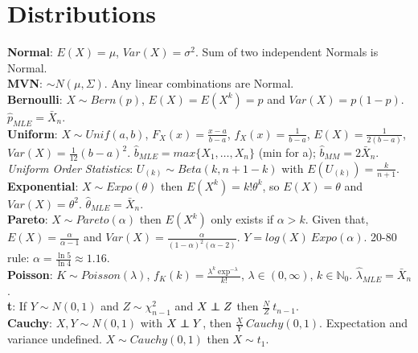 \section*{Distributions}
\textbf{Normal}: $E(X)= \mu$, $Var(X) = \sigma^2$. Sum of two independent Normals is Normal. \\
\textbf{MVN}: $\sim N(\mu, \Sigma)$. Any linear combinations are Normal. \\
\textbf{Bernoulli}: $X\sim Bern(p)$, $E(X) = E(X^k) = p$ and $Var(X) = p(1-p)$. $\hat{p}_{MLE} = \bar{X}_n$.\\
\textbf{Uniform}: $X\sim Unif(a,b)$, $F_X(x) = \frac{x-a}{b-a}$, $f_X(x) = \frac{1}{b-a}$, $E(X) = \frac{1}{2(b-a)}$, $Var(X) = \frac{1}{12}(b-a)^2$. $\hat{b}_{MLE} = max\{X_1, \ldots, X_n\}$ (min for a); $\hat{b}_{MM} = 2\bar{X}_n$.\\
\textit{Uniform Order Statistics}: $U_{(k)} \sim Beta(k, n+1-k)$ with $E(U_{(k)}) = \frac{k}{n+1}$.
\textbf{Exponential}: $X\sim Expo(\theta)$ then $E(X^k) = k!\theta^k$, so $E(X) = \theta$ and $Var(X) = \theta^2$. $\hat{\theta}_{MLE} = \bar{X}_n$.\\
\textbf{Pareto}: $X\sim Pareto(\alpha)$ then $E(X^k)$ only exists if $\alpha>k$. Given that, $E(X) = \frac{\alpha}{\alpha-1}$ and $Var(X) = \frac{\alpha}{(1-\alpha)^2(\alpha-2)}$. $Y = log(X) ~ Expo(\alpha)$. 20-80 rule: $\alpha = \frac{\ln 5}{\ln 4}\approx 1.16$.\\
\textbf{Poisson}: $K\sim Poisson(\lambda)$, $f_K(k) = \frac{\lambda^k\exp^{-\lambda}}{k!}$, $\lambda \in (0, \infty)$, $k\in\mathbb{N}_0$. $\hat{\lambda}_{MLE} = \bar{X}_n$.\\
\textbf{t}: If $Y\sim N(0,1)$ and $Z\sim \chi^2_{n-1}$ and $X\independent Z$ then $\frac{N}{Z}~t_{n-1}$.\\
\textbf{Cauchy}: $X, Y \sim N(0, 1)$ with $X\independent Y$, then $\frac{X}{Y}~Cauchy(0,1)$. Expectation and variance undefined. $X\sim Cauchy(0,1)$ then $X\sim t_1$.